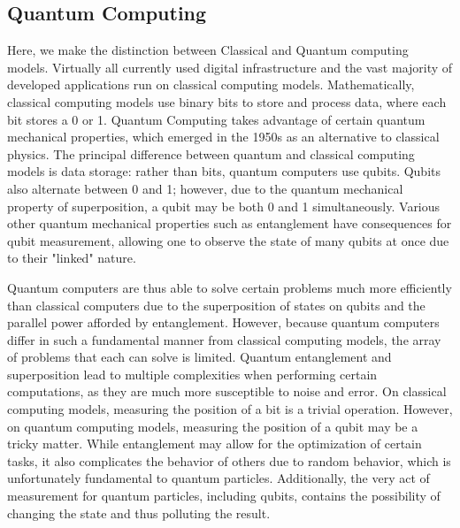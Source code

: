 \documentclass[12pt]{article}
\begin{document}
\subsection{Quantum Computing}
Here, we make the distinction between Classical and Quantum computing models. 
Virtually all currently used digital infrastructure and the vast majority of developed applications run on classical computing models. 
Mathematically, classical computing models use binary bits to store and process data, where each bit stores a 0 or 1.
Quantum Computing takes advantage of certain quantum mechanical properties, which emerged in the 1950s as an alternative to classical physics. 
The principal difference between quantum and classical computing models is data storage: rather than bits, quantum computers use qubits.
Qubits also alternate between 0 and 1; however, due to the quantum mechanical property of superposition, a qubit may be both 0 and 1 simultaneously. \autocite{lapierre_introduction_2021}
Various other quantum mechanical properties such as entanglement\autocite{bub_quantum_2001} have consequences for qubit measurement, allowing one to observe the state of many qubits at once due to their "linked" nature. 

Quantum computers are thus able to solve certain problems much more efficiently than classical computers due to the superposition of states on qubits and the parallel power afforded by entanglement. 
However, because quantum computers differ in such a fundamental manner from classical computing models, the array of problems that each can solve is limited. 
Quantum entanglement and superposition lead to multiple complexities when performing certain computations, as they are much more susceptible to noise and error.
On classical computing models, measuring the position of a bit is a trivial operation. 
However, on quantum computing models, measuring the position of a qubit may be a tricky matter. 
While entanglement may allow for the optimization of certain tasks, it also complicates the behavior of others due to random behavior, which is unfortunately fundamental to quantum particles. \autocite{bub_quantum_2001}
Additionally, the very act of measurement for quantum particles, including qubits, contains the possibility of changing the state and thus polluting the result.
\end{document}
